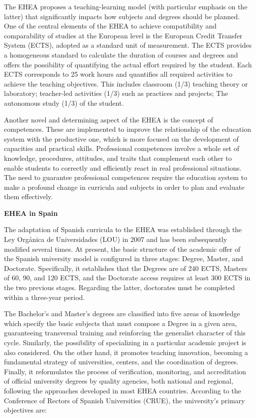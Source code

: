 \documentclass{article}
\begin{document}
The EHEA proposes a teaching-learning model (with particular emphasis on the latter) that significantly impacts how subjects and degrees should be planned. One of the central elements of the EHEA to achieve compatibility and comparability of studies at the European level is the European Credit Transfer System (ECTS), adopted as a standard unit of measurement.
The ECTS provides a homogeneous standard to calculate the duration of courses and degrees and offers the possibility of quantifying the actual effort required by the student. Each ECTS corresponds to 25 work hours and quantifies all required activities to achieve the teaching objectives. This includes classroom (1/3) teaching theory or laboratory; teacher-led activities (1/3) such as practices and projects; The autonomous study (1/3) of the student. 

Another novel and determining aspect of the EHEA is the concept of competences. These are implemented to improve the relationship of the education system with the productive one, which is more focused on the development of capacities and practical skills. Professional competences involve a whole set of knowledge, procedures, attitudes, and traits that complement each other to enable students to correctly and efficiently react in real professional situations. The need to guarantee professional
competences require the education system to make a profound change in curricula and subjects in order to plan and evaluate them effectively.

{\bf EHEA in Spain}

The adaptation of Spanish curricula to the EHEA was established through the Ley Orgánica de Universidades (LOU) in 2007 and has been subsequently modified several times. At present, the basic structure of the academic offer of the Spanish university model is configured in three stages: Degree, Master, and Doctorate. Specifically, it establishes that the Degrees are of 240 ECTS, Masters of 60, 90, and 120 ECTS, and the Doctorate access requires at least 300 ECTS in the two previous stages. Regarding the latter, doctorates must be completed within a three-year period.

The Bachelor's and Master's degrees are classified into five areas of knowledge which specify the basic subjects that must compose a Degree in a given area, guaranteeing transversal training and reinforcing the generalist character of this cycle. Similarly,  the possibility of specializing in a particular academic project is also considered. On the other hand, it promotes teaching innovation, becoming a fundamental strategy of universities, centers, and the coordination of degrees. Finally, it reformulates the process of verification, monitoring, and accreditation of official university degrees by quality agencies, both national and regional, following the approaches developed in most EHEA countries. According to the Conference of Rectors of Spanish Universities (CRUE),  the university's primary objectives are:
\end{document}
